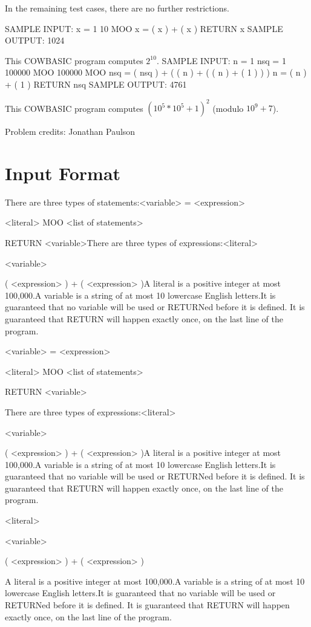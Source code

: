 \documentclass[12pt]{article}
\begin{document}
In the remaining test cases, there are no further restrictions.


SAMPLE INPUT:
x = 1
10 MOO {
  x = ( x ) + ( x )
}
RETURN x
SAMPLE OUTPUT: 
1024

This COWBASIC program computes $2^{10}$.
SAMPLE INPUT:
n = 1
nsq = 1
100000 MOO {
  100000 MOO {
    nsq = ( nsq ) + ( ( n ) + ( ( n ) + ( 1 ) ) )
    n = ( n ) + ( 1 )
  }
}
RETURN nsq
SAMPLE OUTPUT: 
4761

This COWBASIC program computes $(10^5*10^5+1)^2$ (modulo $10^9 + 7$).

Problem credits: Jonathan Paulson



\section*{Input Format}
There are three types of statements:<variable> = <expression>

<literal> MOO {
  <list of statements>
}

RETURN <variable>There are three types of expressions:<literal>

<variable>

( <expression> ) + ( <expression> )A literal is a positive integer at most 100,000.A variable is a string of at most 10 lowercase English letters.It is guaranteed that no variable will be used or RETURNed before it is defined.
It is guaranteed that RETURN will happen exactly once, on the last line of the
program.

<variable> = <expression>

<literal> MOO {
  <list of statements>
}

RETURN <variable>

There are three types of expressions:<literal>

<variable>

( <expression> ) + ( <expression> )A literal is a positive integer at most 100,000.A variable is a string of at most 10 lowercase English letters.It is guaranteed that no variable will be used or RETURNed before it is defined.
It is guaranteed that RETURN will happen exactly once, on the last line of the
program.

<literal>

<variable>

( <expression> ) + ( <expression> )

A literal is a positive integer at most 100,000.A variable is a string of at most 10 lowercase English letters.It is guaranteed that no variable will be used or RETURNed before it is defined.
It is guaranteed that RETURN will happen exactly once, on the last line of the
program.
\end{document}
